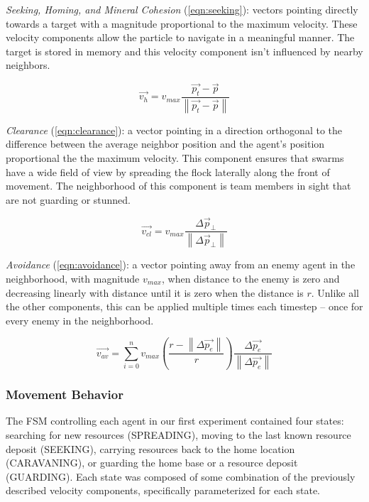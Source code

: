 \documentclass[conference,final]{IEEEtran}
\begin{document}
\textit{Seeking, Homing, and Mineral Cohesion} (\ref{eqn:seeking}): vectors pointing directly towards a target with a magnitude proportional to the maximum velocity. These velocity components allow the particle to navigate in a  meaningful manner. The target is stored in memory and this velocity component isn't influenced by nearby neighbors.

\begin{equation}
    \vec{v_h} = v_{max} \frac {\vec{p_t} - \vec p} { \left\| \vec{p_t} - \vec p \right\| }
    \label{eqn:seeking}
\end{equation}

\textit{Clearance} (\ref{eqn:clearance}): a vector pointing in a direction orthogonal to the difference between the average neighbor position and the agent's position proportional the the maximum velocity. This component ensures that swarms have a wide field of view by spreading the flock laterally along the front of movement. The neighborhood of this component is team members in sight that are not guarding or stunned.

\begin{equation}
    \vec{v_{cl}} = v_{max} \frac {\Delta \vec p_\perp } { \left\| \Delta \vec p_\perp  \right\| }
    \label{eqn:clearance}
\end{equation}

\textit{Avoidance} (\ref{eqn:avoidance}): a vector pointing away from an enemy agent in the neighborhood, with magnitude $v_{max}$, when distance to the enemy is zero and decreasing linearly with distance until it is zero when the distance is $r$. Unlike all the other components, this can be applied multiple times each timestep -- once for every enemy in the neighborhood.

\begin{equation}
    \vec { v_{ av } } =\sum _{i=0}^{n} {v_{ max } \left( \frac{r - \left\| \Delta \vec{p_e} \right\|} {r} \right) \frac { \Delta \vec { p_e }  }{ \left\| \Delta \vec { p_e }  \right\|  }}
    \label{eqn:avoidance}
\end{equation}

\subsubsection{Movement Behavior}

The FSM controlling each agent in our first experiment contained four states: searching for new resources (SPREADING), moving to the last known resource deposit (SEEKING), carrying resources back to the home location (CARAVANING), or guarding the home base or a resource deposit (GUARDING). Each state was composed of some combination of the previously described velocity components, specifically parameterized for each state.
\end{document}
